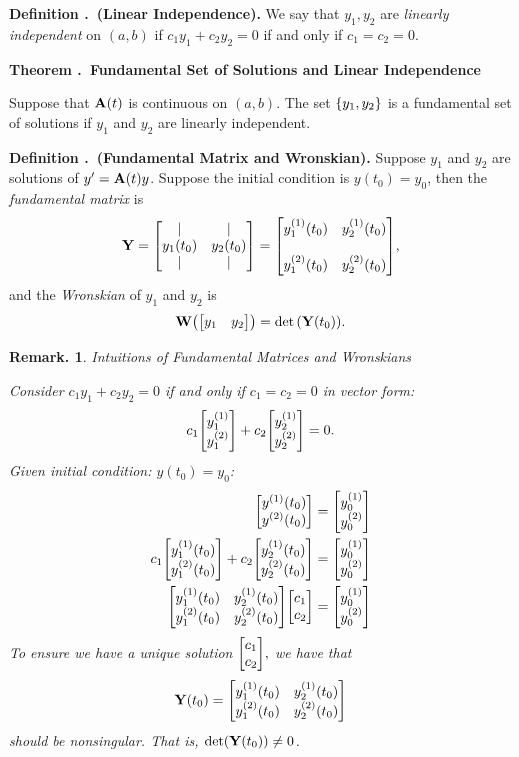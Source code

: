 \documentclass[12pt, a4paper]{article}
\newcounter{index}[subsection]
\newenvironment*{df}[1]{\par\noindent\textbf{Definition \thesubsection.\stepcounter{index}\theindex\ (#1).}}{\par}
\newenvironment*{thm}[1]{\begin{tcolorbox}\par\noindent\textbf{Theorem \thesubsection.\stepcounter{index}\theindex\ #1} \par}{\par\end{tcolorbox}}
\newtheorem*{rmk}{Remark.}
\def\A{\vb A}
\def\Y{\vb Y}
\def\W{\vb W}
\begin{document}
\begin{df}{Linear Independence}
	We say that $y_1,y_2$ are \textit{linearly independent} on $(a,b)$	if $c_1y_1+c_2y_2=0$ if and only if $c_1=c_2=0$.
\end{df}
\begin{thm}{Fundamental Set of Solutions and Linear Independence}
	Suppose that $\A(t)$ is continuous on $(a,b)$. The set $\qty{y_1,y_2}$ is a fundamental set of solutions if $y_1$ and $y_2$ are linearly independent. 	
\end{thm}
\begin{df}{Fundamental Matrix and Wronskian}
	Suppose $y_1$ and $y_2$ are solutions of $y'=\A(t)y$. Suppose the initial condition is $y(t_0)=y_0$, then the \textit{fundamental matrix} is \[\Y=\mqty[|&|\\y_1(t_0)&y_2(t_0)\\|&|]=\mqty[y_1^{(1)}(t_0)&y_2^{(1)}(t_0)\\\\y_1^{(2)}(t_0)&y_2^{(2)}(t_0)],\] and the \textit{Wronskian} of $y_1$ and $y_2$ is \[\W\qty(\mqty[y_1&y_2])=\det\qty(\Y(t_0)).\]
\end{df}
\begin{rmk}{Intuitions of Fundamental Matrices and Wronskians}
	\par Consider $c_1y_1+c_2y_2=0$ if and only if $c_1=c_2=0$ in vector form: \[c_1\mqty[y_1^{(1)}\\y_{1}^{(2)}]+c_2\mqty[y_2^{(1)}\\y_2^{(2)}]=0.\] Given initial condition: $y(t_0)=y_0$: \begin{align*}\mqty[y^{(1)}(t_0)\\y^{(2)}(t_0)]&=\mqty[y_0^{(1)}\\y_0^{(2)}]\\c_1\mqty[y_1^{(1)}(t_0)\\y_1^{(2)}(t_0)]+c_2\mqty[y_2^{(1)}(t_0)\\y_2^{(2)}(t_0)]&=\mqty[y_0^{(1)}\\y_0^{(2)}]\\\mqty[y_1^{(1)}(t_0)&y_2^{(1)}(t_0)\\y_1^{(2)}(t_0)&y_2^{(2)}(t_0)]\mqty[c_1\\c_2]&=\mqty[y_0^{(1)}\\y_0^{(2)}]\end{align*} To ensure we have a unique solution $\mqty[c_1\\c_2],$ we have that \[\Y(t_0)=\mqty[y_1^{(1)}(t_0)&y_2^{(1)}(t_0)\\y_1^{(2)}(t_0)&y_2^{(2)}(t_0)]\] should be nonsingular. That is, $\det(\Y(t_0))\neq0$.
\end{rmk}
\end{document}
